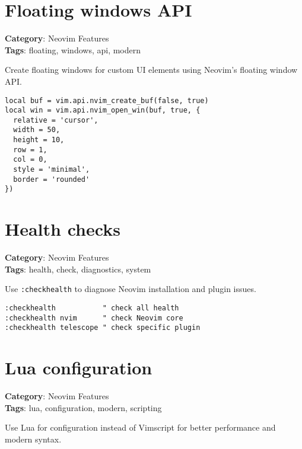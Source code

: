 {{{{{{{{{{\section{Floating windows API}

\textbf{Category}: Neovim Features\\ \textbf{Tags}: floating, windows, api, modern
\vspace{0.5cm}

Create floating windows for custom UI elements using Neovim's floating window API.

\begin{Exa*}{}
\begin{Verbatim}[fontsize=\footnotesize, breaklines, breakanywhere]
local buf = vim.api.nvim_create_buf(false, true)
local win = vim.api.nvim_open_win(buf, true, {
  relative = 'cursor',
  width = 50,
  height = 10,
  row = 1,
  col = 0,
  style = 'minimal',
  border = 'rounded'
})
\end{Verbatim}
\end{Exa*}

\section{Health checks}

\textbf{Category}: Neovim Features\\ \textbf{Tags}: health, check, diagnostics, system
\vspace{0.5cm}

Use {\footnotesize \Verb§:checkhealth§} to diagnose Neovim installation and plugin issues.

\begin{Exa*}{}
\begin{Verbatim}[fontsize=\footnotesize, breaklines, breakanywhere]
:checkhealth           " check all health
:checkhealth nvim      " check Neovim core
:checkhealth telescope " check specific plugin
\end{Verbatim}
\end{Exa*}

\section{Lua configuration}

\textbf{Category}: Neovim Features\\ \textbf{Tags}: lua, configuration, modern, scripting
\vspace{0.5cm}

Use Lua for configuration instead of Vimscript for better performance and modern syntax.

}}}}}}}}}}
